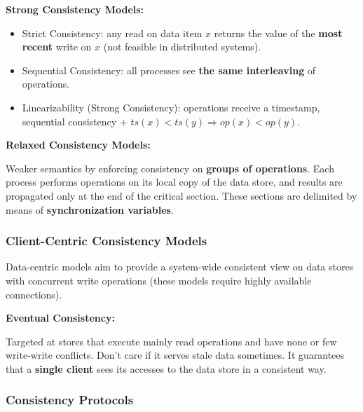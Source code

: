 \textbf{Strong Consistency Models:}
\begin{itemize}
    \item Strict Consistency: any read on data item $x$ returns the value of the \textbf{most recent} write on $x$ (not feasible in distributed systems).
    \item Sequential Consistency: all processes see \textbf{the same interleaving} of operations.
    \item Linearizability (Strong Consistency): operations receive a timestamp, sequential consistency + $ts(x) < ts(y) \Rightarrow op(x) < op(y)$.
\end{itemize}

\textbf{Relaxed Consistency Models:}

Weaker semantics by enforcing consistency on \textbf{groups of operations}.
Each process performs operations on its local copy of the data store, and results are propagated only at the end of the critical section.
These sections are delimited by means of \textbf{synchronization variables}.

\subsubsection*{Client-Centric Consistency Models}

Data-centric models aim to provide a system-wide consistent view on data stores with concurrent write operations (these models require highly available connections).

\textbf{Eventual Consistency:}

Targeted at stores that execute mainly read operations and have none or few write-write conflicts.
Don't care if it serves stale data sometimes.
It guarantees that a \textbf{single client} sees its accesses to the data store in a consistent way.

\subsubsection*{Consistency Protocols}
